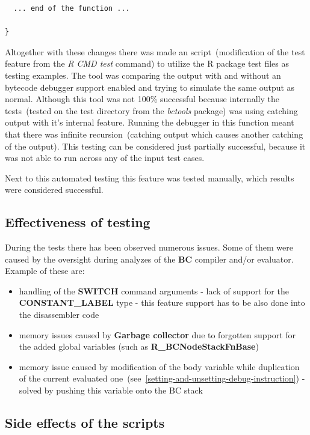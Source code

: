 \documentclass[thesis=M,english]{FITthesis}[2018/10/20]
\begin{document}
{\begin{lstlisting}
  ... end of the function ...

}
\end{lstlisting}

Altogether with these changes there was made an script~(modification of the test feature from the \textit{R CMD test} command) to utilize the R package test files as testing examples. The tool was comparing the output with and without an bytecode debugger support enabled and trying to simulate the same output as normal. Although this tool was not 100\% successful because internally the tests~(tested on the test directory from the \textit{bctools} package) was using catching output with it's internal feature. Running the debugger in this function meant that there was infinite recursion~(catching output which causes another catching of the output). This testing can be considered just partially successful, because it was not able to run across any of the input test cases. 

Next to this automated testing this feature was tested manually, which results were considered successful.

\subsection{Effectiveness of testing}

During the tests there has been observed numerous issues. Some of them were caused by the oversight during analyzes of the \textbf{BC} compiler and/or evaluator. Example of these are:
\begin{itemize}
	\item handling of the \textbf{SWITCH} command arguments - lack of support for the \textbf{CONSTANT{\_}LABEL} type - this feature support has to be also done into the disassembler code
	\item memory issues caused by \textbf{Garbage collector} due to forgotten support for the added global variables (such as \textbf{R{\_}BCNodeStackFnBase})
	\item memory issue caused by modification of the body variable while duplication of the current evaluated one~(see~\ref{setting-and-unsetting-debug-instruction}) - solved by pushing this variable onto the BC stack
\end{itemize}

\subsection{Side effects of the scripts}

}
\end{document}
